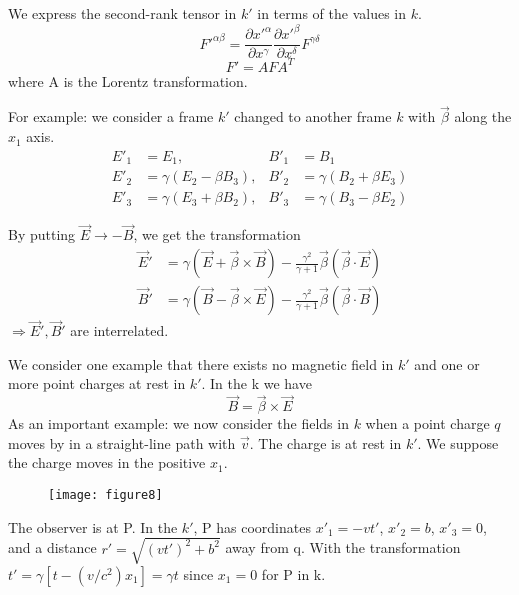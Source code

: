 \documentclass{article}
\begin{document}
	We express the second-rank tensor in $k'$ in terms of the values in $k$.
	\[ F'^{\alpha\beta} = \frac{\partial x'^\alpha}{\partial x^\gamma} \frac{\partial x'^\beta}{\partial x^\delta} F^{\gamma\delta} \]
	\[ F' = A F A^T \]
	where A is the Lorentz transformation.
	
	For example: we consider a frame $k'$ changed to another frame $k$ with $\vec{\beta}$ along the $x_1$ axis.
	\begin{align*}
		E'_1 &= E_1, & B'_1 &= B_1 \\
		E'_2 &= \gamma(E_2 - \beta B_3), & B'_2 &= \gamma(B_2 + \beta E_3) \\
		E'_3 &= \gamma(E_3 + \beta B_2), & B'_3 &= \gamma(B_3 - \beta E_2)
	\end{align*}
	
	By putting $\vec{E} \to -\vec{B}$, we get the transformation
	\begin{align*}
		\vec{E}' &= \gamma(\vec{E} + \vec{\beta} \times \vec{B}) - \frac{\gamma^2}{\gamma+1} \vec{\beta}(\vec{\beta} \cdot \vec{E}) \\
		\vec{B}' &= \gamma(\vec{B} - \vec{\beta} \times \vec{E}) - \frac{\gamma^2}{\gamma+1} \vec{\beta}(\vec{\beta} \cdot \vec{B})
	\end{align*}
	$\Rightarrow \vec{E}', \vec{B}'$ are interrelated.
	
	We consider one example that there exists no magnetic field in $k'$ and one or more point charges at rest in $k'$. In the k we have
	\[ \vec{B} = \vec{\beta} \times \vec{E} \]
	As an important example: we now consider the fields in $k$ when a point charge $q$ moves by in a straight-line path with $\vec{v}$. The charge is at rest in $k'$. We suppose the charge moves in the positive $x_1$.
	
	\begin{figure}[h]
		\centering
		\texttt{[image: figure8]}
		\caption{}
		\label{fig:figure8}
	\end{figure}
	
	The observer is at P. In the $k'$, P has coordinates $x'_1 = -vt'$, $x'_2 = b$, $x'_3 = 0$, and a distance $r' = \sqrt{(vt')^2 + b^2}$ away from q.
	With the transformation $t' = \gamma[t - (v/c^2)x_1] = \gamma t$ since $x_1 = 0$ for P in k.
	
\end{document}
